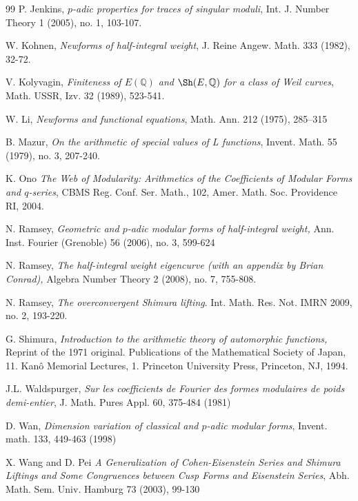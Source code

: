 \documentclass[11pt,letterpaper]{amsart}
\newcommand{\Q}{{\mathbb Q}}
\theoremstyle{remark}
\begin{document}
\begin{thebibliography}{99}
 P. Jenkins, {\it $p$-adic properties for traces of singular moduli}, Int. J. Number Theory 1 (2005), no. 1, 103-107.

 W. Kohnen, {\it Newforms of half-integral weight}, J. Reine Angew. Math. 333 (1982), 32-72.

 V. Kolyvagin, {\it Finiteness of $E(\Q)$ and $\Sh (E, \Q)$  for a class of Weil curves}, Math. USSR,
Izv. 32 (1989), 523-541.

 W. Li, {\it Newforms and functional equations}, Math. Ann. 212 (1975), 285–315

 B. Mazur,
{\it On the arithmetic of special values of L functions}, 
Invent. Math. 55 (1979), no. 3, 207-240.

  K. Ono {\it The Web of Modularity: Arithmetics of the Coefficients
of Modular Forms and $q$-series}, 
CBMS Reg. Conf. Ser. Math., 102, 
Amer. Math. Soc. Providence RI, 2004.

 N. Ramsey, {\it Geometric and $p$-adic modular forms of half-integral weight,} Ann. Inst. Fourier (Grenoble) 56 (2006), no. 3, 599-624

 N. Ramsey, {\it The half-integral weight eigencurve (with an appendix by Brian Conrad),} Algebra Number Theory 2 (2008), no. 7, 755-808. 

 N. Ramsey, {\it The overconvergent Shimura lifting}.
Int. Math. Res. Not. IMRN 2009, no. 2, 193-220.


  G. Shimura, {\it Introduction to the arithmetic theory of automorphic functions,} Reprint of the 1971 original. Publications of the Mathematical Society of Japan, 11. Kan\^o Memorial Lectures, 1. Princeton University Press, Princeton, NJ, 1994.


  J.L. Waldspurger, {\it Sur les coefficients de Fourier des formes modulaires de poids demi-entier}, J. Math. Pures Appl. 60, 375-484 (1981)

 D. Wan, {\it Dimension variation of classical
and $p$-adic modular forms}, Invent. math. 133, 449-463 (1998)

  X. Wang and D. Pei {\it A Generalization of Cohen-Eisenstein Series and Shimura Liftings and
Some Congruences between Cusp Forms and Eisenstein Series}, Abh. Math. Sem. Univ. Hamburg 73 (2003), 99-130


\end{thebibliography}
\end{document}
